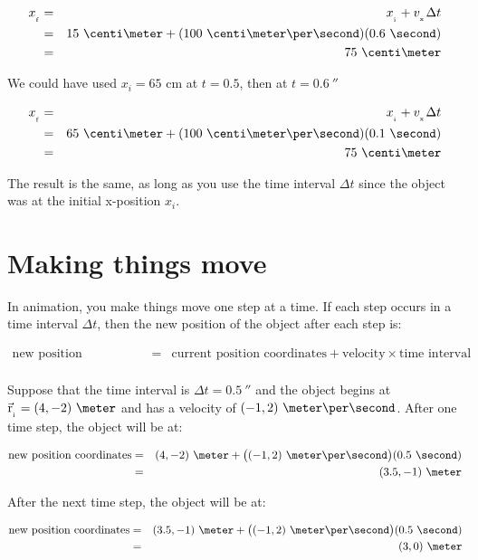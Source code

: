 \begin{eqnarray*}
	\ssub{x}{f} & = & \ssub{x}{i} + \ssub{v}{x}\Delta t \\
	& = & 15\ \centi\meter + (100\ \centi\meter \per \second)(0.6\ \second) \\
	& = & 75\ \centi\meter
\end{eqnarray*}

We could have used $x_i=65$ cm at $t=0.5$, then at $t=0.6\ \second$

\begin{eqnarray*}
	\ssub{x}{f} & = & \ssub{x}{i} + \ssub{v}{x}\Delta t \\
	& = & 65\ \centi\meter + (100\ \centi\meter \per \second)(0.1\ \second) \\
	& = & 75\ \centi\meter
\end{eqnarray*}

The result is the same, as long as you use the time interval $\Delta t$ since the object was at the initial x-position $x_i$.

\section*{Making things move}

In animation, you make things move one step at a time. If each step occurs in a time interval $\Delta t$, then the new position of the object after each step is:

\begin{eqnarray*}
	\mbox{new position coordinates} & = &  \mbox{current position coordinates} + \mbox{velocity} \times \mbox{time interval} \\
\end{eqnarray*}

Suppose that the time interval is $\Delta t=0.5\ \second$ and the object begins at $\vectsub{r}{i}=(4,-2)\ \meter$ and has a velocity of $(-1,2)\ \meter \per \second$. After one time step, the object will be at:

\begin{eqnarray*}
	\mbox{new position coordinates} & = &  (4,-2)\ \meter +\big((-1,2)\ \meter \per \second \big) (0.5\ \second)\\
	& = & (3.5,-1)\ \meter
\end{eqnarray*}

After the next time step, the object will be at:

\begin{eqnarray*}
	\mbox{new position coordinates} & = &  (3.5,-1)\ \meter +\big((-1,2)\ \meter \per \second \big) (0.5\ \second)\\
	& = & (3,0)\ \meter
\end{eqnarray*}

